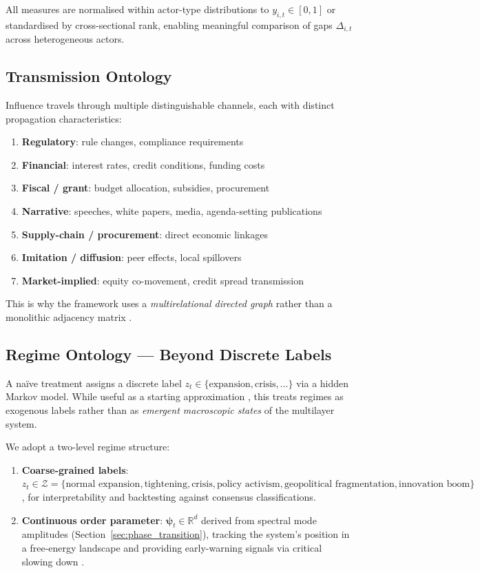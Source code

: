 \documentclass[11pt,a4paper]{article}
\theoremstyle{definition}
\newcommand{\R}{\mathbb{R}}
\newcommand{\bpsi}{\bm{\psi}}
\begin{document}
All measures are normalised within actor-type distributions to $y_{i,t} \in [0,1]$ or standardised by cross-sectional rank, enabling meaningful comparison of gaps $\Delta_{i,t}$ across heterogeneous actors.

\subsection{Transmission Ontology}

Influence travels through multiple distinguishable channels, each with distinct propagation characteristics:
\begin{enumerate}[label=\textbf{C\arabic*},nosep]
  \item \textbf{Regulatory}: rule changes, compliance requirements
  \item \textbf{Financial}: interest rates, credit conditions, funding costs
  \item \textbf{Fiscal / grant}: budget allocation, subsidies, procurement
  \item \textbf{Narrative}: speeches, white papers, media, agenda-setting publications
  \item \textbf{Supply-chain / procurement}: direct economic linkages
  \item \textbf{Imitation / diffusion}: peer effects, local spillovers
  \item \textbf{Market-implied}: equity co-movement, credit spread transmission
\end{enumerate}

This is why the framework uses a \emph{multirelational directed graph} rather than a monolithic adjacency matrix \citep{kivela2014multilayer,boccaletti2014structure}.

\subsection{Regime Ontology --- Beyond Discrete Labels}
\label{sec:regime_ontology}

A na\"ive treatment assigns a discrete label $z_t \in \{\text{expansion}, \text{crisis}, \ldots\}$ via a hidden Markov model. While useful as a starting approximation \citep{hamilton1989new}, this treats regimes as exogenous labels rather than as \emph{emergent macroscopic states} of the multilayer system.

We adopt a two-level regime structure:
\begin{enumerate}[nosep]
  \item \textbf{Coarse-grained labels}: $z_t \in \mathcal{Z} = \{\text{normal expansion}, \text{tightening}, \text{crisis}, \text{policy activism}, \text{geopolitical fragmentation}, \text{innovation boom}\}$, for interpretability and backtesting against consensus classifications.
  \item \textbf{Continuous order parameter}: $\bpsi_t \in \R^d$ derived from spectral mode amplitudes (Section~\ref{sec:phase_transition}), tracking the system's position in a free-energy landscape and providing early-warning signals via critical slowing down \citep{scheffer2009early,sornette2003critical}.
\end{enumerate}
\end{document}
